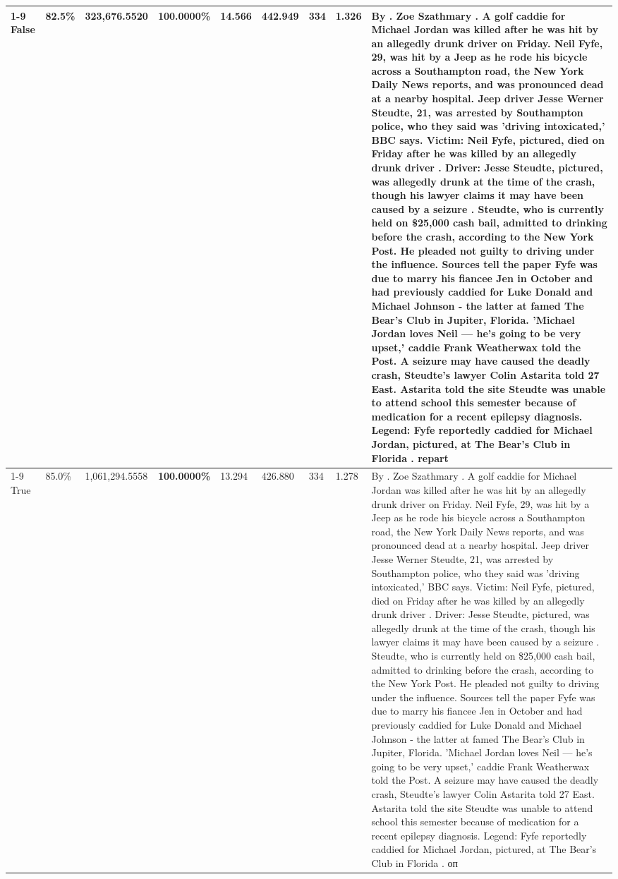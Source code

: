 \begin{table}[H]
\begin{tabular}{lllrlllll}
\cline{1-9}
False & 82.5\% & 323,676.5520 & \bfseries \color{red} 100.0000\% & 14.566 & 442.949 & 334 & 1.326 & By . Zoe Szathmary . A golf caddie for Michael Jordan was killed after he was hit by an allegedly drunk driver on Friday. Neil Fyfe, 29, was hit by a Jeep as he rode his bicycle across a Southampton road, the New York Daily News reports, and was pronounced dead at a nearby hospital. Jeep driver Jesse Werner Steudte, 21, was arrested by Southampton police, who they said was 'driving intoxicated,' BBC says. Victim: Neil Fyfe, pictured, died on Friday after he was killed by an allegedly drunk driver . Driver: Jesse Steudte, pictured, was allegedly drunk at the time of the crash, though his lawyer claims it may have been caused by a seizure . Steudte, who is currently held on \$25,000 cash bail, admitted to drinking before the crash, according to the New York Post. He pleaded not guilty to driving under the influence. Sources tell the paper Fyfe was due to marry his fiancee Jen in October and had previously caddied for Luke Donald and Michael Johnson - the latter at famed The Bear's Club in Jupiter, Florida. 'Michael Jordan loves Neil — he’s going to be very upset,' caddie Frank Weatherwax told the Post. A seizure may have caused the deadly crash, Steudte's lawyer Colin Astarita told 27 East. Astarita told the site Steudte was unable to attend school this semester because of medication for a recent epilepsy diagnosis. Legend: Fyfe reportedly caddied for Michael Jordan, pictured, at The Bear's Club in Florida . repart \\
\cline{1-9}
True & 85.0\% & 1,061,294.5558 & \bfseries \color{red} 100.0000\% & 13.294 & 426.880 & 334 & 1.278 & By . Zoe Szathmary . A golf caddie for Michael Jordan was killed after he was hit by an allegedly drunk driver on Friday. Neil Fyfe, 29, was hit by a Jeep as he rode his bicycle across a Southampton road, the New York Daily News reports, and was pronounced dead at a nearby hospital. Jeep driver Jesse Werner Steudte, 21, was arrested by Southampton police, who they said was 'driving intoxicated,' BBC says. Victim: Neil Fyfe, pictured, died on Friday after he was killed by an allegedly drunk driver . Driver: Jesse Steudte, pictured, was allegedly drunk at the time of the crash, though his lawyer claims it may have been caused by a seizure . Steudte, who is currently held on \$25,000 cash bail, admitted to drinking before the crash, according to the New York Post. He pleaded not guilty to driving under the influence. Sources tell the paper Fyfe was due to marry his fiancee Jen in October and had previously caddied for Luke Donald and Michael Johnson - the latter at famed The Bear's Club in Jupiter, Florida. 'Michael Jordan loves Neil — he’s going to be very upset,' caddie Frank Weatherwax told the Post. A seizure may have caused the deadly crash, Steudte's lawyer Colin Astarita told 27 East. Astarita told the site Steudte was unable to attend school this semester because of medication for a recent epilepsy diagnosis. Legend: Fyfe reportedly caddied for Michael Jordan, pictured, at The Bear's Club in Florida . оп \\

\end{tabular}
\end{table}
